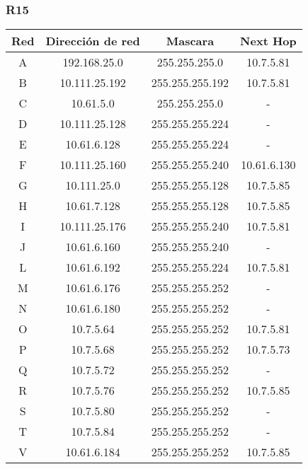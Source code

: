 \subsubsection{R15}
\begin{table}[!htbp]
\centering
  \begin{tabular}{|c|c|c|c|}
  \hline
Red & Dirección de red & Mascara & Next Hop\\ \hline
A & 192.168.25.0 & 255.255.255.0 & 10.7.5.81 \\ \hline
B & 10.111.25.192 & 255.255.255.192 & 10.7.5.81 \\ \hline
C & 10.61.5.0 & 255.255.255.0 & -\\ \hline
D & 10.111.25.128 & 255.255.255.224 & -\\ \hline
E & 10.61.6.128 & 255.255.255.224 & -\\ \hline
F & 10.111.25.160 & 255.255.255.240 & 10.61.6.130 \\ \hline
G & 10.111.25.0 & 255.255.255.128 & 10.7.5.85 \\ \hline
H & 10.61.7.128 & 255.255.255.128 & 10.7.5.85 \\ \hline
I & 10.111.25.176 & 255.255.255.240 & 10.7.5.81 \\ \hline
J & 10.61.6.160 & 255.255.255.240 & -\\ \hline
L & 10.61.6.192 & 255.255.255.224 & 10.7.5.81 \\ \hline
M & 10.61.6.176 & 255.255.255.252 & -\\ \hline
N & 10.61.6.180 & 255.255.255.252 & -\\ \hline
O & 10.7.5.64 & 255.255.255.252 & 10.7.5.81 \\ \hline
P & 10.7.5.68 & 255.255.255.252 & 10.7.5.73 \\ \hline
Q & 10.7.5.72 & 255.255.255.252 & -\\ \hline
R & 10.7.5.76 & 255.255.255.252 & 10.7.5.85 \\ \hline
S & 10.7.5.80 & 255.255.255.252 & -\\ \hline
T & 10.7.5.84 & 255.255.255.252 & -\\ \hline
V & 10.61.6.184 & 255.255.255.252 & 10.7.5.85 \\
  \hline
 \end{tabular}
\end{table}

\newpage
